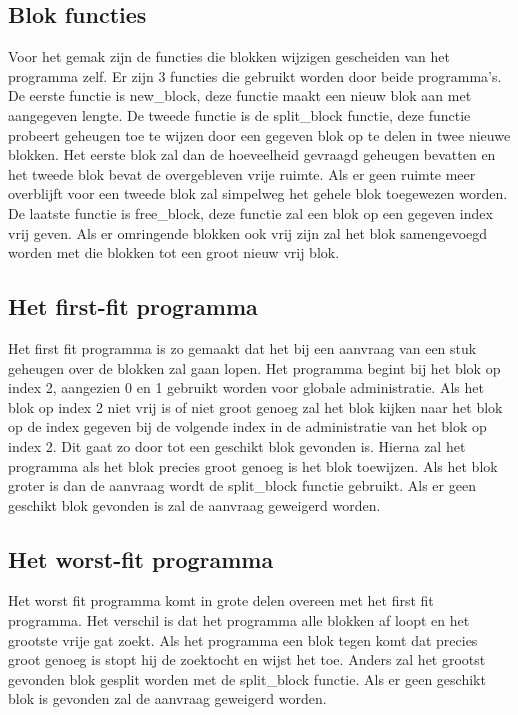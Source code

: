 \documentclass[a4paper]{article}
\begin{document}
		\subsection{Blok functies}\label{sec:programmafunc}
			Voor het gemak zijn de functies die blokken wijzigen gescheiden van het programma zelf. Er zijn 3 functies die gebruikt worden door beide programma's.
			De eerste functie is new\_block, deze functie maakt een nieuw blok aan met aangegeven lengte. De tweede functie is de split\_block functie, deze functie
			probeert geheugen toe te wijzen door een gegeven blok op te delen in twee nieuwe blokken. Het eerste blok zal dan de hoeveelheid gevraagd geheugen bevatten
			en het tweede blok bevat de overgebleven vrije ruimte. Als er geen ruimte meer overblijft voor een tweede blok zal simpelweg het gehele blok toegewezen worden.
			De laatste functie is free\_block, deze functie zal een blok op een gegeven index vrij geven.
			Als er omringende blokken ook vrij zijn zal het blok samengevoegd worden met die blokken tot een groot nieuw vrij blok.
			
		\subsection{Het first-fit programma}\label{sec:programmaff}
			Het first fit programma is zo gemaakt dat het bij een aanvraag van een stuk geheugen over de blokken zal gaan lopen.
			Het programma begint bij het blok op index 2, aangezien 0 en 1 gebruikt worden voor globale administratie.
			Als het blok op index 2 niet vrij is of niet groot genoeg zal het blok kijken naar het blok op de index gegeven bij de volgende index in
			de administratie van het blok op index 2. Dit gaat zo door tot een geschikt blok gevonden is.
			Hierna zal het programma als het blok precies groot genoeg is het blok toewijzen.
			Als het blok groter is dan de aanvraag wordt de split\_block functie gebruikt.
			Als er geen geschikt blok gevonden is zal de aanvraag geweigerd worden.
			
		\subsection{Het worst-fit programma}\label{sec:programmawf}
			Het worst fit programma komt in grote delen overeen met het first fit programma.
			Het verschil is dat het programma alle blokken af loopt en het grootste vrije gat zoekt.
			Als het programma een blok tegen komt dat precies groot genoeg is stopt hij de zoektocht en wijst het toe.
			Anders zal het grootst gevonden blok gesplit worden met de split\_block functie.
			Als er geen geschikt blok is gevonden zal de aanvraag geweigerd worden.
\end{document}
